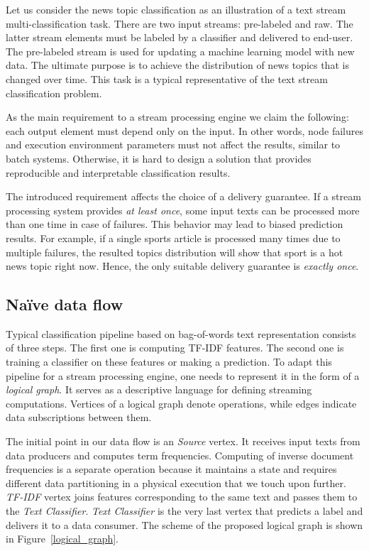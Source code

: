 \label{fs-framework}

Let us consider the news topic classification as an illustration of a text stream multi-classification task. There are two input streams: pre-labeled and raw. The latter stream elements must be labeled by a classifier and delivered to end-user. The pre-labeled stream is used for updating a machine learning model with new data. The ultimate purpose is to achieve the distribution of news topics that is changed over time. This task is a typical representative of the text stream classification problem.

As the main requirement to a stream processing engine we claim the following: each output element must depend only on the input. In other words, node failures and execution environment parameters must not affect the results, similar to batch systems. Otherwise, it is hard to design a solution that provides reproducible and interpretable classification results.

The introduced requirement affects the choice of a delivery guarantee. If a stream processing system provides {\em at least once}, some input texts can be processed more than one time in case of failures. This behavior may lead to biased prediction results. For example, if a single sports article is processed many times due to multiple failures, the resulted topics distribution will show that sport is a hot news topic right now. Hence, the only suitable delivery guarantee is {\em exactly once}.

\subsection{Na\"ive data flow}

Typical classification pipeline based on bag-of-words text representation consists of three steps. The first one is computing TF-IDF features. The second one is training a classifier on these features or making a prediction. To adapt this pipeline for a stream processing engine, one needs to represent it in the form of a {\em logical graph}. It serves as a descriptive language for defining streaming computations. Vertices of a logical graph denote operations, while edges indicate data subscriptions between them. 

The initial point in our data flow is an {\em Source} vertex. It receives input texts from data producers and computes term frequencies. Computing of inverse document frequencies is a separate operation because it maintains a state and requires different data partitioning in a physical execution that we touch upon further. {\em TF-IDF} vertex joins features corresponding to the same text and passes them to the {\em Text Classifier}. {\em Text Classifier} is the very last vertex that predicts a label and delivers it to a data consumer. The scheme of the proposed logical graph is shown in Figure~\ref{logical_graph}.

